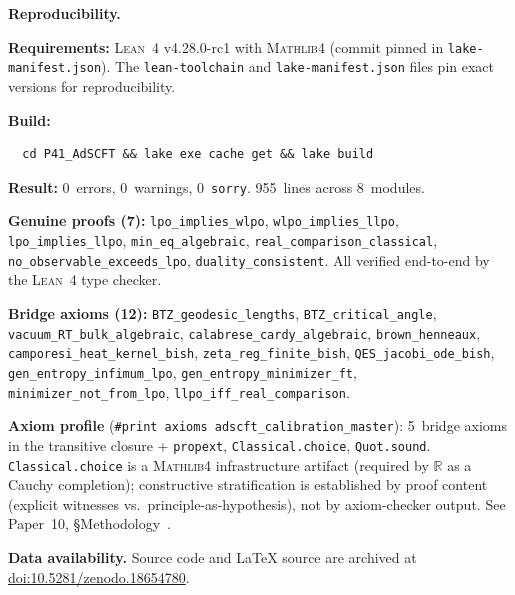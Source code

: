 \documentclass[11pt,a4paper]{article}
\theoremstyle{plain}
\theoremstyle{definition}
\newcommand{\RR}{\mathbb{R}}
\newcommand{\Lean}{\textsc{Lean~4}}
\newcommand{\Mathlib}{\textsc{Mathlib4}}
\begin{document}
\begin{mdframed}[linewidth=1pt, linecolor=black!40,
  backgroundcolor=blue!3, roundcorner=5pt]
\textbf{Reproducibility.}\label{sec:repro}

\medskip\noindent
\textbf{Requirements:} \Lean{} v4.28.0-rc1 with \Mathlib{} (commit pinned
in \texttt{lake-manifest.json}).  The \texttt{lean-toolchain} and
\texttt{lake-manifest.json} files pin exact versions for reproducibility.

\medskip\noindent
\textbf{Build:}
\begin{verbatim}
  cd P41_AdSCFT && lake exe cache get && lake build
\end{verbatim}

\medskip\noindent
\textbf{Result:} 0~errors, 0~warnings, 0~\texttt{sorry}.
955~lines across 8~modules.

\medskip\noindent
\textbf{Genuine proofs (7):} \texttt{lpo\_implies\_wlpo},
\texttt{wlpo\_implies\_llpo}, \texttt{lpo\_implies\_llpo},
\texttt{min\_eq\_algebraic},
\texttt{real\_comparison\_classical},
\texttt{no\_observable\_exceeds\_lpo},
\texttt{duality\_consistent}.
All verified end-to-end by the \Lean{} type checker.

\medskip\noindent
\textbf{Bridge axioms (12):}
\texttt{BTZ\_geodesic\_lengths},
\texttt{BTZ\_critical\_angle},
\texttt{vacuum\_RT\_bulk\_algebraic},
\texttt{calabrese\_cardy\_algebraic},
\texttt{brown\_henneaux},
\texttt{camporesi\_heat\_kernel\_bish},
\texttt{zeta\_reg\_finite\_bish},
\texttt{QES\_jacobi\_ode\_bish},
\texttt{gen\_entropy\_infimum\_lpo},
\texttt{gen\_entropy\_minimizer\_ft},
\texttt{minimizer\_not\_from\_lpo},
\texttt{llpo\_iff\_real\_comparison}.

\medskip\noindent
\textbf{Axiom profile} (\texttt{\#print axioms adscft\_calibration\_master}):
5~bridge axioms in the transitive closure + \texttt{propext},
\texttt{Classical.choice}, \texttt{Quot.sound}.
\texttt{Classical.choice} is a \Mathlib{} infrastructure artifact
(required by $\RR$ as a Cauchy completion);
constructive stratification is established by proof content
(explicit witnesses vs.\ principle-as-hypothesis), not by
axiom-checker output.  See Paper~10, \S Methodology~\cite{Lee26P10}.

\medskip\noindent
\textbf{Data availability.}
Source code and \LaTeX{} source are archived at
\href{https://doi.org/10.5281/zenodo.18654780}{doi:10.5281/zenodo.18654780}.
\end{mdframed}

\end{document}
